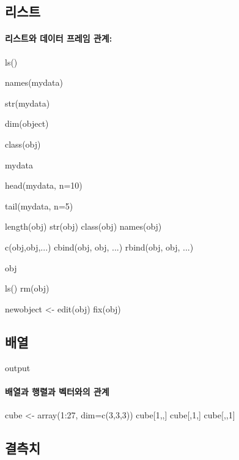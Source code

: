 \documentclass{book}
\begin{document}
\subsection{리스트}
\paragraph{리스트와 데이터 프레임 관계:}
	\begin{Schunk}
	\begin{Soutput}
	ls()

	names(mydata)

	str(mydata)


	dim(object)

	class(obj)

	mydata

	head(mydata, n=10)

	tail(mydata, n=5) 

	length(obj)
	str(obj)
	class(obj)
	names(obj)
	
	c(obj,obj,...)
	cbind(obj, obj, ...)
	rbind(obj, obj, ...)
	
	obj
	
	ls()
	rm(obj)
	
	newobject <- edit(obj)
	fix(obj)
	\end{Soutput}
	\end{Schunk}

\subsection{배열}
\begin{Schunk}
\begin{Soutput}
output
\end{Soutput}
\end{Schunk}

\paragraph{배열과 행렬과 벡터와의 관계}

\begin{Schunk}
\begin{Soutput}
cube <- array(1:27, dim=c(3,3,3))
cube[1,,]
cube[,1,]
cube[,,1]

\end{Soutput}
\end{Schunk}

\subsection{결측치}
\end{document}
